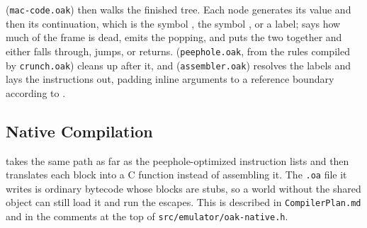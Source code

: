  (\texttt{mac-code.oak}) then walks the finished tree.
Each node generates its value and then its continuation, which is
the symbol , the symbol , or a label;
 says how much of the frame is dead,
 emits the popping, and
 puts the two together and either falls
through, jumps, or returns.  
(\texttt{peephole.oak}, from the rules compiled by
\texttt{crunch.oak}) cleans up after it, and 
(\texttt{assembler.oak}) resolves the labels and lays the
instructions out, padding inline arguments to a reference boundary
according to .

\subsection{Native Compilation}

 takes the same path as far as the
peephole-optimized instruction lists and then translates each block
into a C function instead of assembling it.  The \texttt{.oa} file it
writes is ordinary bytecode whose blocks are stubs, so a world
without the shared object can still load it and run the escapes.
This is described in \texttt{CompilerPlan.md} and in the comments at
the top of \texttt{src/emulator/oak-native.h}.
